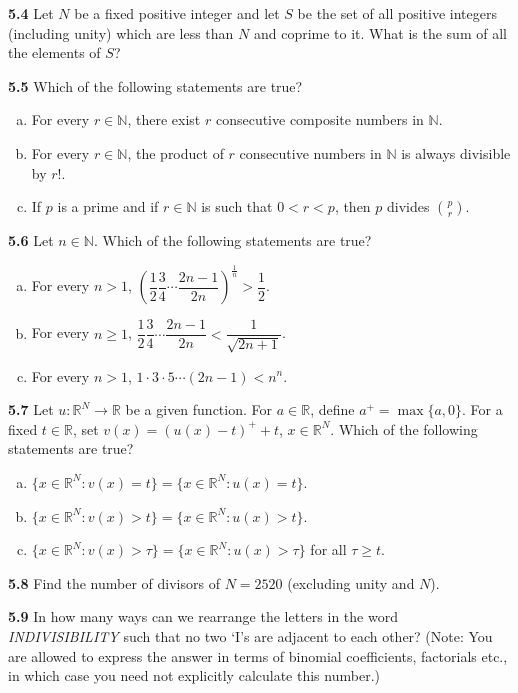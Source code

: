 \documentclass[11pt,a4paper]{article}
\newcommand{\N}{\mathbb{N}}
\newcommand{\R}{\mathbb{R}}
\newcommand{\qitem}[1]{\par\medskip\noindent\textbf{#1}\hspace{0.5em}}
\begin{document}
\qitem{5.4} Let $N$ be a fixed positive integer and let $S$ be the set of all positive integers (including unity) which are less than $N$ and coprime to it. What is the sum of all the elements of $S$?

\qitem{5.5} Which of the following statements are true?
\begin{enumerate}[a.]
  \item For every $r \in \N$, there exist $r$ consecutive composite numbers in $\N$.
  \item For every $r \in \N$, the product of $r$ consecutive numbers in $\N$ is always divisible by $r!$.
  \item If $p$ is a prime and if $r \in \N$ is such that $0 < r < p$, then $p$ divides $\binom{p}{r}$.
\end{enumerate}

\qitem{5.6} Let $n \in \N$. Which of the following statements are true?
\begin{enumerate}[a.]
  \item For every $n > 1$, $\left(\dfrac{1}{2}\dfrac{3}{4}\cdots\dfrac{2n-1}{2n}\right)^{\frac{1}{n}} > \dfrac{1}{2}$.
  \item For every $n \ge 1$, $\dfrac{1}{2}\dfrac{3}{4}\cdots\dfrac{2n-1}{2n} < \dfrac{1}{\sqrt{2n+1}}$.
  \item For every $n > 1$, $1\cdot 3\cdot 5\cdots(2n-1) < n^n$.
\end{enumerate}

\qitem{5.7} Let $u : \R^N \to \R$ be a given function. For $a \in \R$, define $a^+ = \max\{a, 0\}$. For a fixed $t \in \R$, set $v(x) = (u(x) - t)^+ + t$, $x \in \R^N$. Which of the following statements are true?
\begin{enumerate}[a.]
  \item $\{x \in \R^N : v(x) = t\} = \{x \in \R^N : u(x) = t\}$.
  \item $\{x \in \R^N : v(x) > t\} = \{x \in \R^N : u(x) > t\}$.
  \item $\{x \in \R^N : v(x) > \tau\} = \{x \in \R^N : u(x) > \tau\}$ for all $\tau \ge t$.
\end{enumerate}

\qitem{5.8} Find the number of divisors of $N = 2520$ (excluding unity and $N$).

\qitem{5.9} In how many ways can we rearrange the letters in the word \emph{INDIVISIBILITY} such that no two `I's are adjacent to each other? (Note: You are allowed to express the answer in terms of binomial coefficients, factorials etc., in which case you need not explicitly calculate this number.)
\end{document}
